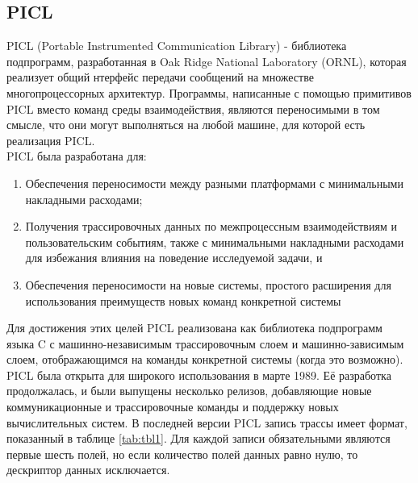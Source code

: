 \subsection{PICL}
PICL (Portable Instrumented Communication Library)  - библиотека подпрограмм, разработанная в Oak Ridge National Laboratory (ORNL), которая реализует общий
нтерфейс передачи сообщений на множестве многопроцессорных архитектур. Программы, написанные с помощью примитивов PICL вместо команд среды взаимодействия, являются переносимыми в том смысле, что они могут выполняться на любой машине, для которой есть реализация PICL.\\
PICL была разработана для:
\begin{enumerate} 
\item Обеспечения переносимости между разными платформами с минимальными накладными расходами;
\item Получения трассировочных данных по межпроцессным взаимодействиям и пользовательским событиям, также с минимальными накладными расходами для избежания влияния на поведение исследуемой задачи, и
\item Обеспечения переносимости на новые системы, простого расширения для использования преимуществ новых команд конкретной системы
\end{enumerate} 
Для достижения этих целей PICL реализована как библиотека подпрограмм языка C с машинно-независимым трассировочным слоем и машинно-зависимым слоем, отображающимся на команды конкретной системы (когда это возможно). PICL  была открыта для широкого использования в марте 1989. Её разработка продолжалась, и были выпущены несколько релизов, добавляющие новые коммуникационные и трассировочные команды и поддержку новых вычислительных систем.
В последней версии PICL запись трассы имеет формат, показанный в таблице \ref{tab:tbl1}. Для каждой записи обязательными являются первые шесть полей, но если количество полей данных равно нулю, то дескриптор данных исключается.

